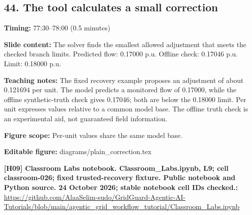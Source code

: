 \documentclass[10pt,letterpaper]{article}
\begin{document}
\subsection*{44. The tool calculates a small correction}
\textbf{Timing:} 77:30--78:00 (0.5 minutes)\par
\textbf{Slide content:} The solver finds the smallest allowed adjustment that meets the checked branch limits.
Predicted flow: 0.17000 p.u. Offline check: 0.17046 p.u. Limit: 0.18000 p.u.\par
\textbf{Teaching notes:} The fixed recovery example proposes an adjustment of about 0.121694 per unit. The model predicts a monitored flow of 0.17000, while the offline synthetic-truth check gives 0.17046; both are below the 0.18000 limit. Per unit expresses values relative to a common model base. The offline truth check is an experimental aid, not guaranteed field information.\par
\textbf{Figure scope:} Per-unit values share the same model base.\par
\textbf{Editable figure:} diagrams/plain\_correction.tex\par
\textbf{[H09] Classroom Labs notebook. Classroom\_Labs.ipynb, L9; cell classroom-026; fixed trusted-recovery fixture. Public notebook and Python source. 24 October 2026; stable notebook cell IDs checked.:} \href{https://github.com/AlaaSelim-sudo/GridGuard-Agentic-AI-Tutorials/blob/main/agentic_grid_workflow_tutorial/Classroom_Labs.ipynb}{\small\ttfamily https:/\allowbreak{}/\allowbreak{}github.\allowbreak{}com/\allowbreak{}AlaaSelim-\allowbreak{}sudo/\allowbreak{}GridGuard-\allowbreak{}Agentic-\allowbreak{}AI-\allowbreak{}Tutorials/\allowbreak{}blob/\allowbreak{}main/\allowbreak{}agentic\_\allowbreak{}grid\_\allowbreak{}workflow\_\allowbreak{}tutorial/\allowbreak{}Classroom\_\allowbreak{}Labs.\allowbreak{}ipynb}\par
\par\medskip
\end{document}
